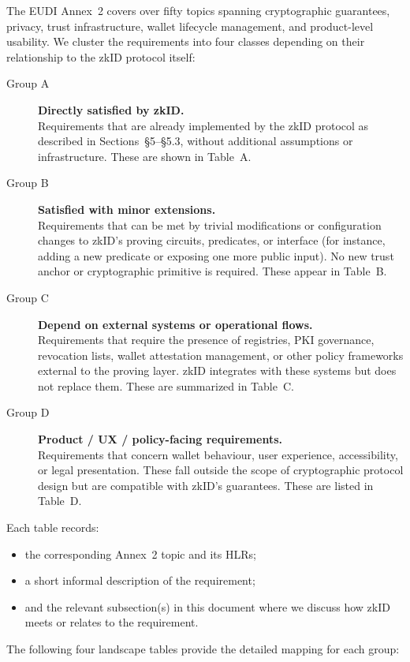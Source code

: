 
\noindent The EUDI Annex~2 covers over fifty topics spanning cryptographic guarantees, privacy, trust infrastructure, wallet lifecycle management, and product-level usability. We cluster the requirements into four classes depending on their relationship to the zkID protocol itself:

\begin{description}
  \item[Group A] \textbf{Directly satisfied by zkID.} \\
  Requirements that are already implemented by the zkID protocol as described in Sections~\S5--\S5.3, without additional assumptions or infrastructure. These are shown in Table~A.

  \item[Group B] \textbf{Satisfied with minor extensions.} \\
  Requirements that can be met by trivial modifications or configuration changes to zkID’s proving circuits, predicates, or interface (for instance, adding a new predicate or exposing one more public input). No new trust anchor or cryptographic primitive is required. These appear in Table~B.

  \item[Group C] \textbf{Depend on external systems or operational flows.} \\
  Requirements that require the presence of registries, PKI governance, revocation lists, wallet attestation management, or other policy frameworks external to the proving layer. zkID integrates with these systems but does not replace them. These are summarized in Table~C.

  \item[Group D] \textbf{Product / UX / policy-facing requirements.} \\
  Requirements that concern wallet behaviour, user experience, accessibility, or legal presentation. These fall outside the scope of cryptographic protocol design but are compatible with zkID’s guarantees. These are listed in Table~D.
\end{description}

\medskip
\noindent
Each table records:
\begin{itemize}
  \item the corresponding Annex~2 topic and its HLRs;
  \item a short informal description of the requirement;
  \item and the relevant subsection(s) in this document where we discuss how zkID meets or relates to the requirement.
\end{itemize}

\medskip
\noindent
The following four landscape tables provide the detailed mapping for each group:

